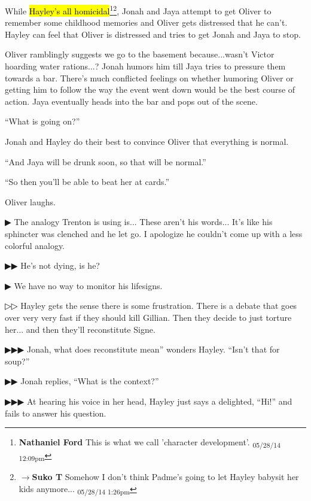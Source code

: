 While \hl{Hayley's all homicidal}\footnote{\textbf{Nathaniel Ford }This is what we call 'character development'. \textsubscript{05/28/14 12:09pm}}\footnote{$\rightarrow$\textbf{Suko T }Somehow I don't think Padme's going to let Hayley babysit her kids anymore... \textsubscript{05/28/14 1:26pm}}, Jonah and Jaya attempt to get Oliver to remember some childhood memories and Oliver gets distressed that he can't.  Hayley can feel that Oliver is distressed and tries to get Jonah and Jaya to stop.



Oliver ramblingly suggests we go to the basement because...wasn't Victor hoarding water rations...?  Jonah humors him till Jaya tries to pressure them towards a bar. There's much conflicted feelings on whether humoring Oliver or getting him to follow the way the event went down would be the best course of action.  Jaya eventually heads into the bar and pops out of the scene. 



``What is going on?''

Jonah and Hayley do their best to convince Oliver that everything is normal.

``And Jaya will be drunk soon, so that will be normal.''

``So then you'll be able to beat her at cards.''

Oliver laughs.



 {\color[RGB]{68,68,68}▶}  The analogy Trenton is using is... These aren't his words... It's like his sphincter was clenched and he let go.  I apologize he couldn't come up with a less colorful analogy.  

 {\color[RGB]{68,68,68}▶▶ } He's not dying, is he?

 {\color[RGB]{68,68,68}▶ } We have no way to monitor his lifesigns. 



▷▷ Hayley gets the sense there is some frustration.  There is a debate that goes over very very fast if they should kill Gillian.  Then they decide to just torture her... and then they'll reconstitute Signe. 



 {\color[RGB]{68,68,68}▶▶▶  } Jonah, what does reconstitute mean'' wonders Hayley.  ``Isn't that for soup?''

 {\color[RGB]{68,68,68}▶▶ } Jonah replies, ``What is the context?''

 {\color[RGB]{68,68,68}▶▶▶ } At hearing his voice in her head, Hayley just says a delighted, ``Hi!'' and fails to answer his question.





